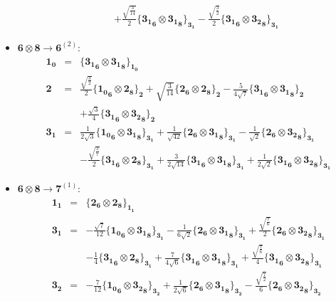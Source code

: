 \documentclass[english]{article}
\newcommand{\subcg}[3]{\big\{ {#1}\otimes{#2}\big\}^{}_{#3}}
\newcommand{\rep}[1]{\mathbf{#1}}
\begin{document}
\begin{itemize}
\begin{eqnarray*}
 & & +\frac{\sqrt{\frac{3}{14}}}{2}\subcg{\rep{3_1}_{\rep{6}}}{\rep{3_1}_{\rep{8}}}{\rep{3_1}}-\frac{\sqrt{\frac{3}{2}}}{2}\subcg{\rep{3_1}_{\rep{6}}}{\rep{3_2}_{\rep{8}}}{\rep{3_1}}
\end{eqnarray*}
\item $\rep{6}\otimes\rep{8}\to\rep{6}^{(2)}$:
\begin{eqnarray*}
\rep{1_0} &=& \subcg{\rep{3_1}_{\rep{6}}}{\rep{3_1}_{\rep{8}}}{\rep{1_0}}
\\
\rep{2} &=& \frac{\sqrt{\frac{3}{2}}}{2}\subcg{\rep{1_0}_{\rep{6}}}{\rep{2}_{\rep{8}}}{\rep{2}}+\sqrt{\frac{3}{14}}\subcg{\rep{2}_{\rep{6}}}{\rep{2}_{\rep{8}}}{\rep{2}}-\frac{5}{4 \sqrt{7}}\subcg{\rep{3_1}_{\rep{6}}}{\rep{3_1}_{\rep{8}}}{\rep{2}} \\ 
 & & +\frac{\sqrt{3}}{4}\subcg{\rep{3_1}_{\rep{6}}}{\rep{3_2}_{\rep{8}}}{\rep{2}}
\\
\rep{3_1} &=& \frac{1}{2 \sqrt{3}}\subcg{\rep{1_0}_{\rep{6}}}{\rep{3_1}_{\rep{8}}}{\rep{3_1}}+\frac{1}{\sqrt{42}}\subcg{\rep{2}_{\rep{6}}}{\rep{3_1}_{\rep{8}}}{\rep{3_1}}-\frac{1}{\sqrt{2}}\subcg{\rep{2}_{\rep{6}}}{\rep{3_2}_{\rep{8}}}{\rep{3_1}} \\ 
 & & -\frac{\sqrt{\frac{3}{7}}}{2}\subcg{\rep{3_1}_{\rep{6}}}{\rep{2}_{\rep{8}}}{\rep{3_1}}+\frac{3}{2 \sqrt{14}}\subcg{\rep{3_1}_{\rep{6}}}{\rep{3_1}_{\rep{8}}}{\rep{3_1}}+\frac{1}{2 \sqrt{2}}\subcg{\rep{3_1}_{\rep{6}}}{\rep{3_2}_{\rep{8}}}{\rep{3_1}}
\end{eqnarray*}
\item $\rep{6}\otimes\rep{8}\to\rep{7}^{(1)}$:
\begin{eqnarray*}
\rep{1_1} &=& \subcg{\rep{2}_{\rep{6}}}{\rep{2}_{\rep{8}}}{\rep{1_1}}
\\
\rep{3_1} &=& -\frac{\sqrt{7}}{12}\subcg{\rep{1_0}_{\rep{6}}}{\rep{3_1}_{\rep{8}}}{\rep{3_1}}-\frac{1}{6 \sqrt{2}}\subcg{\rep{2}_{\rep{6}}}{\rep{3_1}_{\rep{8}}}{\rep{3_1}}+\frac{\sqrt{\frac{7}{6}}}{2}\subcg{\rep{2}_{\rep{6}}}{\rep{3_2}_{\rep{8}}}{\rep{3_1}} \\ 
 & & -\frac{1}{4}\subcg{\rep{3_1}_{\rep{6}}}{\rep{2}_{\rep{8}}}{\rep{3_1}}+\frac{7}{4 \sqrt{6}}\subcg{\rep{3_1}_{\rep{6}}}{\rep{3_1}_{\rep{8}}}{\rep{3_1}}+\frac{\sqrt{\frac{7}{6}}}{4}\subcg{\rep{3_1}_{\rep{6}}}{\rep{3_2}_{\rep{8}}}{\rep{3_1}}
\\
\rep{3_2} &=& -\frac{7}{12}\subcg{\rep{1_0}_{\rep{6}}}{\rep{3_2}_{\rep{8}}}{\rep{3_2}}+\frac{1}{2 \sqrt{6}}\subcg{\rep{2}_{\rep{6}}}{\rep{3_1}_{\rep{8}}}{\rep{3_2}}-\frac{\sqrt{\frac{7}{2}}}{6}\subcg{\rep{2}_{\rep{6}}}{\rep{3_2}_{\rep{8}}}{\rep{3_2}} \\ 

\end{eqnarray*}
\end{itemize}
\end{document}
